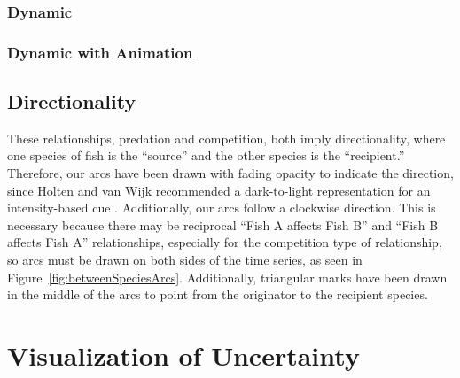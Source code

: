 
\subsubsection{Dynamic}

\subsubsection{Dynamic with Animation}

\subsection{Directionality}

These relationships, predation and competition, both imply directionality, where one species of fish is the ``source'' and the other species is the ``recipient.''  Therefore, our arcs have been drawn with fading opacity to indicate the direction, since Holten and van Wijk recommended a dark-to-light representation for an intensity-based cue \cite{holten2009}.  Additionally, our arcs follow a clockwise direction.  This is necessary because there may be reciprocal ``Fish A affects Fish B'' and ``Fish B affects Fish A'' relationships, especially for the competition type of relationship, so arcs must be drawn on both sides of the time series, as seen in Figure~\ref{fig:betweenSpeciesArcs}.  Additionally, triangular marks have been drawn in the middle of the arcs to point from the originator to the recipient species.

\section{Visualization of Uncertainty}

